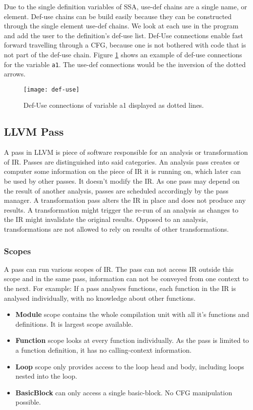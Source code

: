 Due to the single definition variables of SSA, use-def chains are a single name, or element. Def-use chains can be build easily because they can be constructed through the single element use-def chains. We look at each use in the program and add the user to the definition's def-use list. Def-Use connections enable fast forward travelling through a CFG, because one is not bothered with code that is not part of the def-use chain. Figure \ref{def-use} shows an example of def-use connections for the variable \verb|a1|. The use-def connections would be the inversion of the dotted arrows. \cite{Rastello:2016:SCD:3002539}
\begin{figure}[t]
	\centering
	\texttt{[image: def-use]}
	\caption{Def-Use connections of variable a1 displayed as dotted lines.}
	\label{def-use}
\end{figure}

\subsection{LLVM Pass}\label{llvmpass}
A pass in LLVM is piece of software responsible for an analysis or transformation of IR. Passes are distinguished into said categories. An analysis pass creates or computer some information on the piece of IR it is running on, which later can be used by other passes. It doesn't modify the IR. As one pass may depend on the result of another analysis, passes are scheduled accordingly by the pass manager. A transformation pass alters the IR in place and does not produce any results. A transformation might trigger the re-run of an analysis as changes to the IR might invalidate the original results. Opposed to an analysis, transformations are not allowed to rely on results of other transformations. \cite{llvm-passes}

\subsubsection{Scopes}
A pass can run various scopes of IR. The pass can not access IR outside this scope and in the same pass, information can not be conveyed from one context to the next. For example: If a pass analyses functions, each function in the IR is analysed individually, with no knowledge about other functions. \cite{llvm-scopes}
\begin{itemize}
	\item \textbf{Module} scope contains the whole compilation unit with all it's functions and definitions. It is largest scope available.
	\item \textbf{Function} scope looks at every function individually. As the pass is limited to a function definition, it has no calling-context information. 
	\item \textbf{Loop} scope only provides access to the loop head and body, including loops nested into the loop.
	\item \textbf{BasicBlock} can only access a single basic-block. No CFG manipulation possible.
\end{itemize}

